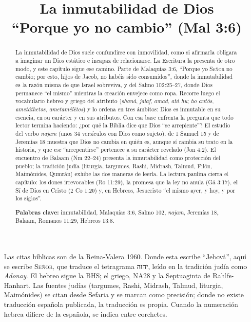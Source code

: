 \documentclass[11pt,letterpaper]{article}
\title{\color{azul}\bfseries La inmutabilidad de Dios\\[4pt]\large\color{gris}\mdseries ``Porque yo \SENOR{} no cambio'' (Mal 3:6)}
\author{}\date{}
\newcommand{\heb}[1]{\mbox{\foreignlanguage{hebrew}{#1}}}
\newcommand{\SENOR}{\textsc{Señor}}
\begin{document}
\maketitle\thispagestyle{empty}

\begin{abstract}\noindent
La inmutabilidad de Dios suele confundirse con inmovilidad, como si afirmarla obligara a imaginar un Dios estático e incapaz de relacionarse. La Escritura la presenta de otro modo, y este capítulo sigue ese camino. Parte de Malaquías 3:6, ``Porque yo \SENOR{} no cambio; por esto, hijos de Jacob, no habéis sido consumidos'', donde la inmutabilidad es la razón misma de que Israel sobreviva, y del Salmo 102:25--27, donde Dios permanece ``el mismo'' mientras la creación envejece como ropa. Recorre luego el vocabulario hebreo y griego del atributo (\emph{shaná}, \emph{jalaf}, \emph{amad}, \emph{atá hu}; \emph{ho autós}, \emph{ametáthetos}, \emph{ametamélētos}) y lo ordena en tres ámbitos: Dios es inmutable en su esencia, en su carácter y en sus atributos. Con esa base enfrenta la pregunta que todo lector termina haciendo: ¿por qué la Biblia dice que Dios ``se arrepiente''? El estudio del verbo \emph{najam} (unos 34 versículos con Dios como sujeto), de 1 Samuel 15 y de Jeremías 18 muestra que Dios no cambia en quién es, aunque sí cambia su trato en la historia, y que ese ``arrepentirse'' pertenece a su carácter revelado (Jon 4:2). El encuentro de Balaam (Nm 22--24) presenta la inmutabilidad como protección del pueblo; la tradición judía (liturgia, targumes, Rashi, Midrash, Talmud, Filón, Maimónides, Qumrán) exhibe las dos maneras de leerla. La lectura paulina cierra el capítulo: los dones irrevocables (Ro 11:29), la promesa que la ley no anula (Gá 3:17), el Sí de Dios en Cristo (2 Co 1:20) y, en Hebreos, Jesucristo ``el mismo ayer, y hoy, y por los siglos''.
\par\smallskip\noindent\textbf{Palabras clave:} inmutabilidad, Malaquías 3:6, Salmo 102, \emph{najam}, Jeremías 18, Balaam, Romanos 11:29, Hebreos 13:8.\end{abstract}

\begin{nota}
Las citas bíblicas son de la Reina-Valera 1960. Donde esta escribe ``Jehová'', aquí se escribe \SENOR, que traduce el tetragrama \heb{יהוה}, leído en la tradición judía como \emph{Adonay}. El hebreo sigue la BHS; el griego, NA28 y la Septuaginta de Rahlfs-Hanhart. Las fuentes judías (targumes, Rashi, Midrash, Talmud, liturgia, Maimónides) se citan desde Sefaria y se marcan como precisión; donde no existe traducción española publicada, la traducción es propia. Cuando la numeración hebrea difiere de la española, se indica entre corchetes.
\end{nota}
\end{document}
